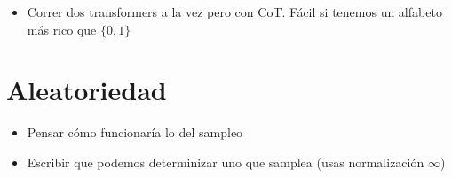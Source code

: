 \documentclass{article}
\begin{document}
\begin{itemize}
    \item Correr dos transformers a la vez pero con CoT. Fácil si tenemos un alfabeto más rico que $\{0,1\}$
\end{itemize}



\section{Aleatoriedad}
\begin{itemize}
    \item Pensar cómo funcionaría lo del sampleo
    \item Escribir que podemos determinizar uno que samplea (usas normalización $\infty$)
\end{itemize}
\end{document}

